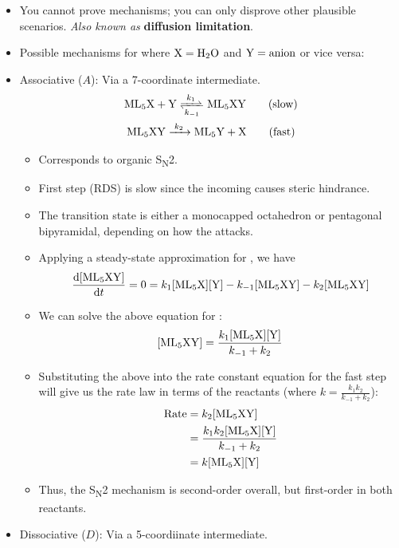 \documentclass[../notes.tex]{subfiles}
\begin{document}
\begin{itemize}
    \item You cannot prove mechanisms; you can only disprove other plausible scenarios. \emph{Also known as} \textbf{diffusion limitation}.
    \item Possible mechanisms for  where $\ce{X}=\ce{H2O}$ and $\ce{Y}=\text{anion}$ or vice versa:
    \item Associative ($A$): Via a 7-coordinate intermediate.
    \begin{gather*}
        \ce{ML5X + Y <=>[$k_1$][$k_{-1}$] ML5XY}\tag{slow}\\
        \ce{ML5XY ->[$k_2$] ML5Y + X}\tag{fast}
    \end{gather*}
    \begin{itemize}
        \item Corresponds to organic S\textsubscript{N}2.
        \item First step (RDS) is slow since the incoming  causes steric hindrance.
        \item The transition state is either a monocapped octahedron or pentagonal bipyramidal, depending on how the  attacks.
        \item Applying a steady-state approximation for \ce{[ML5XY]}, we have
        \begin{equation*}
            \dv{\ce{[ML5XY]}}{t} = 0 = k_1\ce{[ML5X][Y]}-k_{-1}\ce{[ML5XY]}-k_2\ce{[ML5XY]}
        \end{equation*}
        \item We can solve the above equation for \ce{[ML5XY]}:
        \begin{equation*}
            \ce{[ML5XY]} = \frac{k_1\ce{[ML5X][Y]}}{k_{-1}+k_2}
        \end{equation*}
        \item Substituting the above into the rate constant equation for the fast step will give us the rate law in terms of the reactants (where $k=\frac{k_1k_2}{k_{-1}+k_2}$):
        \begin{align*}
            \text{Rate} &= k_2\ce{[ML5XY]}\\
            &= \frac{k_1k_2\ce{[ML5X][Y]}}{k_{-1}+k_2}\\
            &= k\ce{[ML5X][Y]}
        \end{align*}
        \item Thus, the S\textsubscript{N}2 mechanism is second-order overall, but first-order in both reactants.
    \end{itemize}
    \item Dissociative ($D$): Via a 5-coordiinate intermediate.

\end{itemize}
\end{document}
